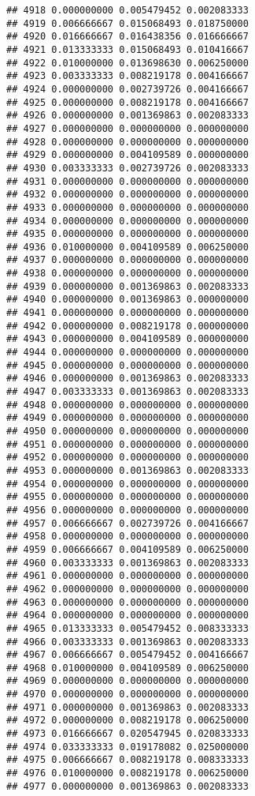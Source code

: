 \documentclass[
]{article}
\begin{document}
\begin{verbatim}
## 4918 0.000000000 0.005479452 0.002083333
## 4919 0.006666667 0.015068493 0.018750000
## 4920 0.016666667 0.016438356 0.016666667
## 4921 0.013333333 0.015068493 0.010416667
## 4922 0.010000000 0.013698630 0.006250000
## 4923 0.003333333 0.008219178 0.004166667
## 4924 0.000000000 0.002739726 0.004166667
## 4925 0.000000000 0.008219178 0.004166667
## 4926 0.000000000 0.001369863 0.002083333
## 4927 0.000000000 0.000000000 0.000000000
## 4928 0.000000000 0.000000000 0.000000000
## 4929 0.000000000 0.004109589 0.000000000
## 4930 0.003333333 0.002739726 0.002083333
## 4931 0.000000000 0.000000000 0.000000000
## 4932 0.000000000 0.000000000 0.000000000
## 4933 0.000000000 0.000000000 0.000000000
## 4934 0.000000000 0.000000000 0.000000000
## 4935 0.000000000 0.000000000 0.000000000
## 4936 0.010000000 0.004109589 0.006250000
## 4937 0.000000000 0.000000000 0.000000000
## 4938 0.000000000 0.000000000 0.000000000
## 4939 0.000000000 0.001369863 0.002083333
## 4940 0.000000000 0.001369863 0.000000000
## 4941 0.000000000 0.000000000 0.000000000
## 4942 0.000000000 0.008219178 0.000000000
## 4943 0.000000000 0.004109589 0.000000000
## 4944 0.000000000 0.000000000 0.000000000
## 4945 0.000000000 0.000000000 0.000000000
## 4946 0.000000000 0.001369863 0.002083333
## 4947 0.003333333 0.001369863 0.002083333
## 4948 0.000000000 0.000000000 0.000000000
## 4949 0.000000000 0.000000000 0.000000000
## 4950 0.000000000 0.000000000 0.000000000
## 4951 0.000000000 0.000000000 0.000000000
## 4952 0.000000000 0.000000000 0.000000000
## 4953 0.000000000 0.001369863 0.002083333
## 4954 0.000000000 0.000000000 0.000000000
## 4955 0.000000000 0.000000000 0.000000000
## 4956 0.000000000 0.000000000 0.000000000
## 4957 0.006666667 0.002739726 0.004166667
## 4958 0.000000000 0.000000000 0.000000000
## 4959 0.006666667 0.004109589 0.006250000
## 4960 0.003333333 0.001369863 0.002083333
## 4961 0.000000000 0.000000000 0.000000000
## 4962 0.000000000 0.000000000 0.000000000
## 4963 0.000000000 0.000000000 0.000000000
## 4964 0.000000000 0.000000000 0.000000000
## 4965 0.013333333 0.005479452 0.008333333
## 4966 0.003333333 0.001369863 0.002083333
## 4967 0.006666667 0.005479452 0.004166667
## 4968 0.010000000 0.004109589 0.006250000
## 4969 0.000000000 0.000000000 0.000000000
## 4970 0.000000000 0.000000000 0.000000000
## 4971 0.000000000 0.001369863 0.002083333
## 4972 0.000000000 0.008219178 0.006250000
## 4973 0.016666667 0.020547945 0.020833333
## 4974 0.033333333 0.019178082 0.025000000
## 4975 0.006666667 0.008219178 0.008333333
## 4976 0.010000000 0.008219178 0.006250000
## 4977 0.000000000 0.001369863 0.002083333

\end{verbatim}
\end{document}
